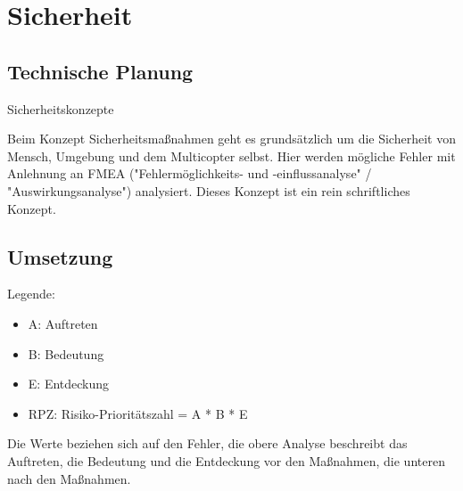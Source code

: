 \section{Sicherheit}

  \subsection{Technische Planung}

Sicherheitskonzepte

Beim Konzept Sicherheitsmaßnahmen geht es grundsätzlich um die Sicherheit von Mensch, Umgebung und dem Multicopter selbst. Hier werden mögliche Fehler mit Anlehnung an FMEA ("Fehlermöglichkeits- und -einflussanalyse" / "Auswirkungsanalyse") analysiert. Dieses Konzept ist ein rein schriftliches Konzept.

  \subsection{Umsetzung}

    Legende:
    \begin{itemize}
    \item A: Auftreten
    \item B: Bedeutung
    \item E: Entdeckung
    \item RPZ: Risiko-Prioritätszahl = A * B * E
    \end{itemize}

    Die Werte beziehen sich auf den Fehler, die obere Analyse beschreibt das Auftreten, die Bedeutung und die Entdeckung vor den Maßnahmen, die unteren nach den Maßnahmen.

